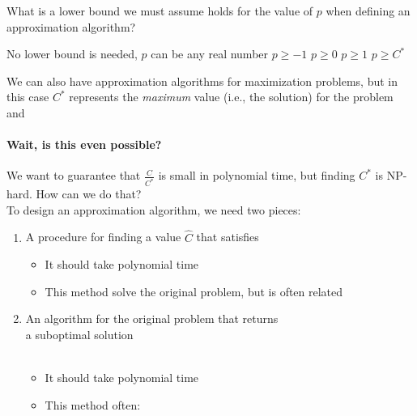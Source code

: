 \documentclass[11  pt]{article}
\begin{document}
	\vfill
	
	\begin{Qu}
		What is a lower bound we must assume holds for the value of $p$ when defining an approximation algorithm?
		\begin{itemize}
			\aitem No lower bound is needed, $p$ can be any real number
			\bitem $ p \geq -1$
			\citem $p \geq 0$
			\ditem $p \geq 1$
			\eitem $p \geq C^*$
		\end{itemize}
	\end{Qu}
	\vs{1cm}
	
	We can also have approximation algorithms for maximization problems, but in this case $C^*$ represents the \emph{maximum} value (i.e., the solution) for the problem and  %
	
	
	
	\newpage
	
	\paragraph{Wait, is this even possible?}
	We want to guarantee that $\frac{C}{C^*}$ is small in polynomial time, but finding $C^*$ is NP-hard. How can we do that? \\
	
	To design an approximation algorithm, we need two pieces:
	\begin{enumerate}
		\item {} A procedure for finding a value $\hat{C}$ that satisfies \hide{$\hat{C} \leq C^*$}
		\begin{itemize}
			\item It should take polynomial time \\
			\item This method  solve the original problem, but is often related
		\end{itemize}
		\item {} An algorithm for the original problem that returns \\
		
		a suboptimal solution  \\ \\
		\begin{itemize}
			\item It should take polynomial time \\
			\item This method often: \\
		\end{itemize}
	\end{enumerate}
	
\end{document}
